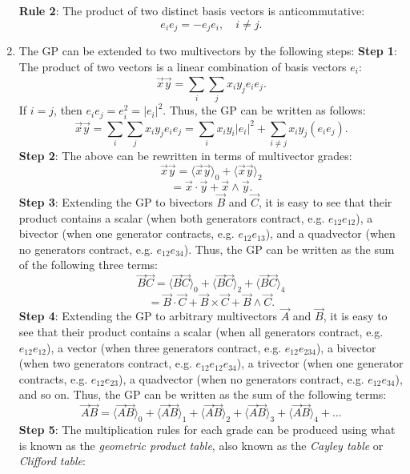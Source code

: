 \documentclass{article}
\begin{document}
\begin{enumerate}
    \subitem \textbf{Rule 2}: The product of two distinct basis vectors is anticommutative:
    $$e_i e_j = -e_j e_i, \quad i \neq j.$$ 
    \item The GP can be extended to two multivectors by the following steps:
    \subitem \textbf{Step 1}: The product of two vectors is a linear combination of basis vectors $e_i$:
    $$\vec{x}\vec{y} = \sum_{i}^{} \sum_{j}^{} x_i y_j e_i e_j.$$
    If $i = j$, then $e_i e_j = e_i^2 = \vert e_i \vert^2$. 
    Thus, the GP can be written as follows:
    $$\vec{x}\vec{y} = \sum_{i}^{} \sum_{j}^{} x_i y_j e_i e_j = \sum_{i}^{} x_i y_i \vert e_i \vert^2 + \sum_{i \neq j}^{} x_i y_j (e_i e_j).$$
    \subitem \textbf{Step 2}: The above can be rewritten in terms of multivector grades:
    $$\vec{x}\vec{y} = \langle \vec{x} \vec{y} \rangle_0 + \langle \vec{x} \vec{y} \rangle_2$$
    $$ = \vec{x} \cdot \vec{y} + \vec{x} \wedge \vec{y}.$$
    \subitem \textbf{Step 3}: Extending the GP to bivectors $\vec{B}$ and $\vec{C}$, it is easy to see that their product contains 
    a scalar (when both generators contract, e.g. $e_{12} e_{12}$), a bivector (when one generator contracts, e.g. $e_{12} e_{13}$), and 
    a quadvector (when no generators contract, e.g. $e_{12} e_{34}$). Thus, the GP can be written as the sum of the following three terms:
    $$\vec{B}\vec{C} = \langle \vec{B} \vec{C} \rangle_0 + \langle \vec{B} \vec{C} \rangle_2 + \langle \vec{B} \vec{C} \rangle_4$$
    $$ = \vec{B} \cdot \vec{C} + \vec{B} \times \vec{C} + \vec{B} \wedge \vec{C}.$$
    \subitem \textbf{Step 4}: Extending the GP to arbitrary multivectors $\vec{A}$ and $\vec{B}$, 
    it is easy to see that their product contains
    a scalar (when all generators contract, e.g. $e_{12} e_{12}$), 
    a vector (when three generators contract, e.g. $e_{12} e_{234}$),
    a bivector (when two generators contract, e.g. $e_{12} e_{12} e_{34}$),
    a trivector (when one generator contracts, e.g. $e_{12} e_{23}$),
    a quadvector (when no generators contract, e.g. $e_{12} e_{34}$), and so on.
    Thus, the GP can be written as the sum of the following terms:
    $$\vec{A}\vec{B} = \langle \vec{A} \vec{B} \rangle_0 + \langle \vec{A} \vec{B} \rangle_1 + \langle \vec{A} \vec{B} \rangle_2 + \langle \vec{A} \vec{B} \rangle_3 + \langle \vec{A} \vec{B} \rangle_4 + \ldots$$
    \subitem \textbf{Step 5}: The multiplication rules for each grade can be produced using what is known as the \emph{geometric product table}, 
    also known as the \emph{Cayley table} or \emph{Clifford table}:


\end{enumerate}
\end{document}
